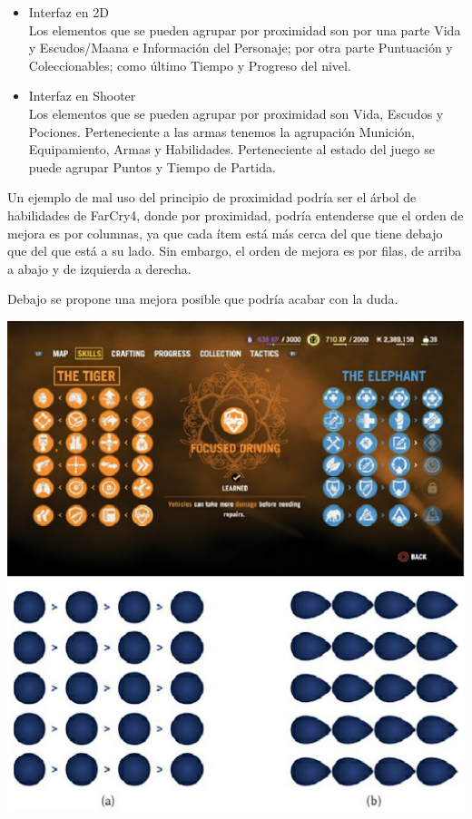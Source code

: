 \begin{itemize}
\begin{itemize}
\item Interfaz en 2D\\
Los elementos que se pueden agrupar por proximidad son por una parte Vida y Escudos/Maana e Información del Personaje; por otra parte  Puntuación y Coleccionables;  como último Tiempo y Progreso del nivel.
\end{itemize}
\begin{itemize}
\item Interfaz en Shooter\\
Los elementos que se pueden agrupar por proximidad son Vida, Escudos y   Pociones.  Perteneciente a las armas tenemos la agrupación Munición, Equipamiento,  Armas y Habilidades.  Perteneciente al estado del juego se puede agrupar Puntos y Tiempo de Partida.
\end{itemize}

Un ejemplo de mal uso del principio de proximidad podría ser el árbol de habilidades de FarCry4, donde por proximidad, podría entenderse que el orden de mejora es por columnas, ya que cada ítem está más cerca del que tiene debajo que del que está a su lado. Sin embargo, el orden de mejora es por filas, de arriba a abajo y de izquierda a derecha.

Debajo se propone una mejora posible que podría acabar con la duda.

\includegraphics[width=\textwidth]{Imagenes/EjemploProximidad1.png}
\includegraphics[width=\textwidth]{Imagenes/EjemploProximidad2.png}


\end{itemize}

